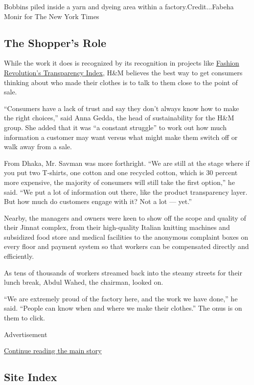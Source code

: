 Bobbins piled inside a yarn and dyeing area within a
factory.Credit...Fabeha Monir for The New York Times

\hypertarget{the-shoppers-role}{%
\subsection{The Shopper's Role}\label{the-shoppers-role}}

While the work it does is recognized by its recognition in projects like
\href{https://issuu.com/fashionrevolution/docs/fashion_transparency_index_2019?e=25766662/69342298}{Fashion
Revolution's Transparency Index}, H\&M believes the best way to get
consumers thinking about who made their clothes is to talk to them close
to the point of sale.

``Consumers have a lack of trust and say they don't always know how to
make the right choices,'' said Anna Gedda, the head of sustainability
for the H\&M group. She added that it was ``a constant struggle'' to
work out how much information a customer may want versus what might make
them switch off or walk away from a sale.

From Dhaka, Mr. Savman was more forthright. ``We are still at the stage
where if you put two T-shirts, one cotton and one recycled cotton, which
is 30 percent more expensive, the majority of consumers will still take
the first option,'' he said. ``We put a lot of information out there,
like the product transparency layer. But how much do customers engage
with it? Not a lot --- yet.''

Nearby, the managers and owners were keen to show off the scope and
quality of their Jinnat complex, from their high-quality Italian
knitting machines and subsidized food store and medical facilities to
the anonymous complaint boxes on every floor and payment system so that
workers can be compensated directly and efficiently.

As tens of thousands of workers streamed back into the steamy streets
for their lunch break, Abdul Wahed, the chairman, looked on.

``We are extremely proud of the factory here, and the work we have
done,'' he said. ``People can know when and where we make their
clothes.'' The onus is on them to click.

Advertisement

\protect\hyperlink{after-bottom}{Continue reading the main story}

\hypertarget{site-index}{%
\subsection{Site Index}\label{site-index}}

